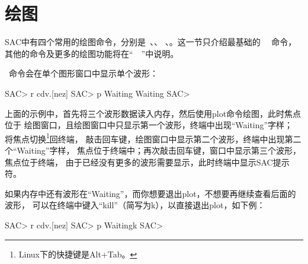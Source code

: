 \section{绘图}
\label{sec:display}

SAC中有四个常用的绘图命令，分别是~、、
、。这一节只介绍最基础的~~
命令，其他的命令及更多的绘图功能将在``~~''中说明。

~命令会在单个图形窗口中显示单个波形：
\begin{SACCode}
SAC> r cdv.[nez]
SAC> p
Waiting
Waiting
SAC>
\end{SACCode}

上面的示例中，首先将三个波形数据读入内存，然后使用plot命令绘图，此时焦点位于
绘图窗口，且绘图窗口中只显示第一个波形，终端中出现``Waiting''字样；
将焦点切换\footnote{Linux下的快捷键是Alt+Tab。}回终端，
敲击回车键，绘图窗口中显示第二个波形，终端中出现第二个``Waiting''字样，
焦点位于终端中；再次敲击回车键，窗口中显示第三个波形，焦点位于终端，
由于已经没有更多的波形需要显示，此时终端中显示SAC提示符。

如果内存中还有波形在``Waiting''，而你想要退出plot，不想要再继续查看后面的波形，
可以在终端中键入``kill''（简写为k），以直接退出plot，如下例：
\begin{SACCode}
SAC> r cdv.[nez]
SAC> p
Waitingk
SAC>
\end{SACCode}
